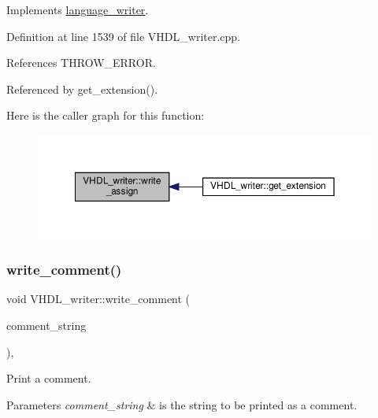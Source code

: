 Implements \hyperlink{classlanguage__writer_a49b971e9b90296b0096a78c06219992d}{language\+\_\+writer}.



Definition at line 1539 of file V\+H\+D\+L\+\_\+writer.\+cpp.



References T\+H\+R\+O\+W\+\_\+\+E\+R\+R\+OR.



Referenced by get\+\_\+extension().

Here is the caller graph for this function\+:
\nopagebreak
\begin{figure}[H]
\begin{center}
\leavevmode
\includegraphics[width=350pt]{d0/d0c/structVHDL__writer_af48ed8414cfbd1a7713d3bab7b4b5218_icgraph}
\end{center}
\end{figure}
\mbox{\label{structVHDL__writer_a9e5dd9daf73ae7621fd861dd1ad81f41}} 
\subsubsection{\texorpdfstring{write\+\_\+comment()}{write\_comment()}}
{\footnotesize\ttfamily void V\+H\+D\+L\+\_\+writer\+::write\+\_\+comment (\begin{DoxyParamCaption}\item[{const std\+::string \&}]{comment\+\_\+string }\end{DoxyParamCaption})\hspace{0.3cm}{\ttfamily [override]}, {\ttfamily [virtual]}}



Print a comment. 


\begin{DoxyParams}{Parameters}
{\em comment\+\_\+string} & is the string to be printed as a comment. \\
\hline
\end{DoxyParams}


